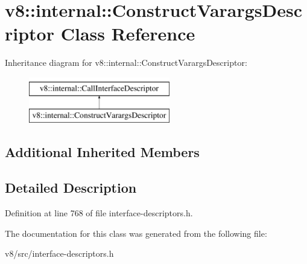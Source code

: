 \hypertarget{classv8_1_1internal_1_1ConstructVarargsDescriptor}{}\section{v8\+:\+:internal\+:\+:Construct\+Varargs\+Descriptor Class Reference}
\label{classv8_1_1internal_1_1ConstructVarargsDescriptor}
Inheritance diagram for v8\+:\+:internal\+:\+:Construct\+Varargs\+Descriptor\+:\begin{figure}[H]
\begin{center}
\leavevmode
\includegraphics[height=2.000000cm]{classv8_1_1internal_1_1ConstructVarargsDescriptor}
\end{center}
\end{figure}
\subsection*{Additional Inherited Members}


\subsection{Detailed Description}


Definition at line 768 of file interface-\/descriptors.\+h.



The documentation for this class was generated from the following file\+:\begin{DoxyCompactItemize}
\item 
v8/src/interface-\/descriptors.\+h\end{DoxyCompactItemize}
